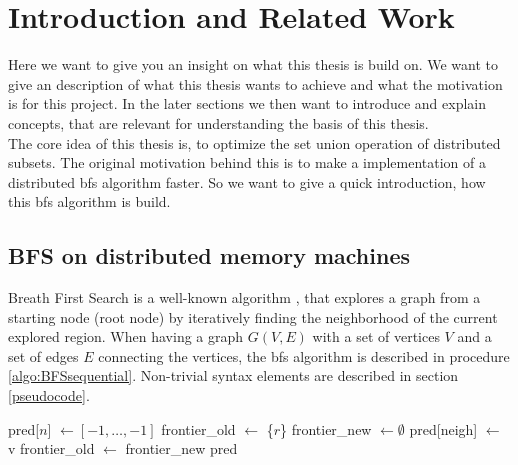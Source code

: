 
\chapter{Introduction and Related Work}
Here we want to give you an insight on what this thesis is build on. We want to give an description of what this thesis wants to achieve and what the motivation is for this project. In the later sections we then want to introduce and explain concepts, that are relevant for understanding the basis of this thesis.\\
The core idea of this thesis is, to optimize the set union operation of distributed subsets. The original motivation behind this is to make a implementation of a distributed \ac{bfs} algorithm faster. So we want to give a quick introduction, how this \ac{bfs} algorithm is build.
\section{BFS on distributed memory machines}
Breath First Search is a well-known algorithm \cite{standardBFS}, that explores a graph from a starting node (root node) by iteratively finding the neighborhood of the current explored region.
When having a graph $G(V, E)$ with a set of vertices $V$ and a set of edges $E$ connecting the vertices, the \ac{bfs} algorithm is described in procedure \ref{algo:BFSsequential}. Non-trivial syntax elements are described in section \ref{pseudocode}.
\begin{algorithm}
	\caption{Sequential implementation of BFS\\
	$n$: number of vertices\\
	$E$: set of edges\\
	$r$: root node}
	\label{algo:BFSsequential}
	\begin{algorithmic}[1]
		\State pred[$n$] $\gets [-1, \dots, -1]$ 
		\State frontier\_old $\gets$ \{$r$\}
			\State frontier\_new $\gets \emptyset$
					\State pred[neigh] $\gets$ v
					\State {}
 				\EndIf
				\EndFor
			\EndFor
			\State frontier\_old $\gets$ frontier\_new
		\EndWhile
		\State \Return pred
		\EndProcedure
	\end{algorithmic}
\end{algorithm}

